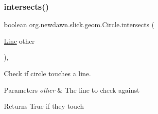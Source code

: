 \subsubsection{\texorpdfstring{intersects()}{intersects()}\hspace{0.1cm}{\footnotesize\ttfamily [3/3]}}
{\footnotesize\ttfamily boolean org.\+newdawn.\+slick.\+geom.\+Circle.\+intersects (\begin{DoxyParamCaption}\item[{\mbox{\hyperlink{classorg_1_1newdawn_1_1slick_1_1geom_1_1_line}{Line}}}]{other }\end{DoxyParamCaption})\hspace{0.3cm}{\ttfamily [inline]}, {\ttfamily [private]}}

Check if circle touches a line. 
\begin{DoxyParams}{Parameters}
{\em other} & The line to check against \\
\hline
\end{DoxyParams}
\begin{DoxyReturn}{Returns}
True if they touch 
\end{DoxyReturn}

